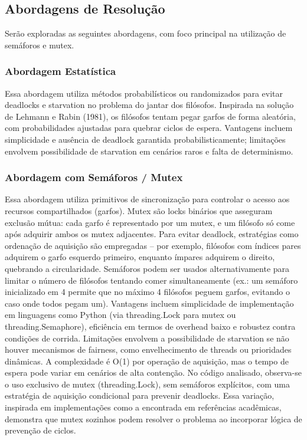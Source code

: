 \subsection{Abordagens de Resolução}
Serão exploradas as seguintes abordagens, com foco principal na utilização de semáforos e mutex.

\subsubsection{Abordagem Estatística}
Essa abordagem utiliza métodos probabilísticos ou randomizados para evitar deadlocks e starvation no problema do jantar dos filósofos. Inspirada na solução de Lehmann e Rabin (1981), os filósofos tentam pegar garfos de forma aleatória, com probabilidades ajustadas para quebrar ciclos de espera. Vantagens incluem simplicidade e ausência de deadlock garantida probabilisticamente; limitações envolvem possibilidade de starvation em cenários raros e falta de determinismo.

\subsubsection{Abordagem com Semáforos / Mutex}
Essa abordagem utiliza primitivos de sincronização para controlar o acesso aos recursos compartilhados (garfos). Mutex são locks binários que asseguram exclusão mútua: cada garfo é representado por um mutex, e um filósofo só come após adquirir ambos os mutex adjacentes. Para evitar deadlock, estratégias como ordenação de aquisição são empregadas – por exemplo, filósofos com índices pares adquirem o garfo esquerdo primeiro, enquanto ímpares adquirem o direito, quebrando a circularidade. Semáforos podem ser usados alternativamente para limitar o número de filósofos tentando comer simultaneamente (ex.: um semáforo inicializado em 4 permite que no máximo 4 filósofos peguem garfos, evitando o caso onde todos pegam um). Vantagens incluem simplicidade de implementação em linguagens como Python (via threading.Lock para mutex ou threading.Semaphore), eficiência em termos de overhead baixo e robustez contra condições de corrida. Limitações envolvem a possibilidade de starvation se não houver mecanismos de fairness, como envelhecimento de threads ou prioridades dinâmicas. A complexidade é O(1) por operação de aquisição, mas o tempo de espera pode variar em cenários de alta contenção. No código analisado, observa-se o uso exclusivo de mutex (threading.Lock), sem semáforos explícitos, com uma estratégia de aquisição condicional para prevenir deadlocks. Essa variação, inspirada em implementações como a encontrada em referências acadêmicas, demonstra que mutex sozinhos podem resolver o problema ao incorporar lógica de prevenção de ciclos.

